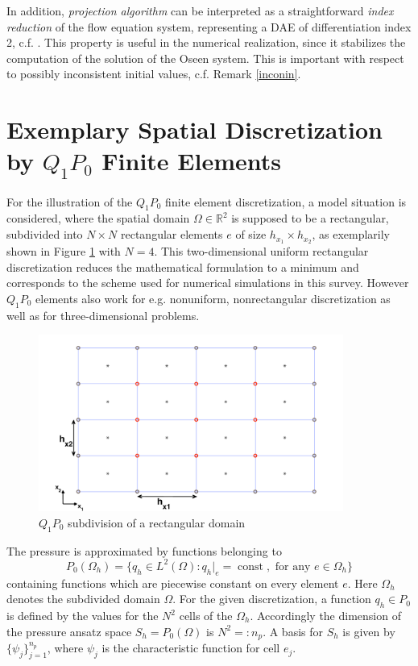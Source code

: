 \documentclass[a4paper,10pt,BCOR=15mm]{scrbook}
\DeclareMathOperator{\const}{const}
\begin{document}
In addition, \textit{projection algorithm} can be interpreted as a straightforward \textit{index reduction} of the flow equation system, representing a DAE of differentiation index 2, c.f. \cite{howe,weic}. This property is useful in the numerical realization, since it stabilizes the computation of the solution of the Oseen system. This is important with respect to possibly inconsistent initial values, c.f. Remark \ref{inconin}.


\section[Exemplary $Q_1P_0$ Discretization]{Exemplary Spatial Discretization by $Q_1P_0$ Finite Elements}\label{q1p0}
For the illustration of the $Q_1P_0$ finite element discretization, a model situation is considered, where the spatial domain $\Omega \in \mathbb R^2$ is supposed to be a rectangular, subdivided into $N \times N$ rectangular elements $e$ of size $h_{x_1} \times h_{x_2}$, as exemplarily shown in Figure \ref{q1p0sub} with $N=4$. This two-dimensional uniform rectangular discretization reduces the mathematical formulation to a minimum and corresponds to the scheme used for numerical simulations in this survey. However $Q_1P_0$ elements also work for e.g. nonuniform, nonrectangular discretization as well as for three-dimensional problems.
\begin{figure}[htbp]
  \centering
  \begin{minipage}[b]{10 cm}
    \includegraphics[width=10cm]{pics/q1p0/femsubdiv4.pdf}  
  \end{minipage}
  \caption{$Q_1P_0$ subdivision of a rectangular domain} 
\label{q1p0sub}
\end{figure}

The pressure is approximated by functions belonging to 
\begin{equation*}
 P_0(\Omega_h) = \bigl \{ q_h \in L^2(\Omega): q_h \bigl \vert _e= \const , \text{ for any } e\in \Omega_h \bigr \}
\end{equation*}
containing functions which are piecewise constant on every element $e$. Here $\Omega_h$ denotes the subdivided domain $\Omega$. For the given discretization, a function $q_h \in P_0$ is defined by the values for the $N^2$ cells of the $\Omega_h$. Accordingly the dimension of the pressure ansatz space $S_h=P_0(\Omega)$ is $N^2=:n_p$. A basis for $S_h$ is given by $\bigl \{ \psi_j \bigr \}_{j=1}^{n_p}$, where $\psi_j$ is the characteristic function for cell $e_j$.
\end{document}
